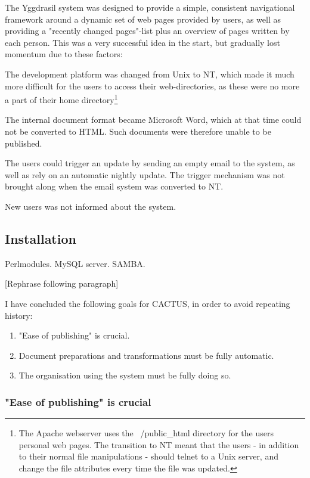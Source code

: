 The Yggdrasil system was designed to provide a simple, consistent
navigational framework around a dynamic set of web pages provided by
users, as well as providing a "recently changed pages"-list plus an
overview of pages written by each person.  This was a very successful
idea in the start, but gradually lost momentum due to these factors:

The development platform was changed from Unix to NT, which made it
much more difficult for the users to access their web-directories, as
these were no more a part of their home directory\footnote{The Apache
  webserver uses the ~/public\_html directory for the users personal
  web pages.  The transition to NT meant that the users - in addition
  to their normal file manipulations - should telnet to a Unix server,
  and change the file attributes every time the file was updated.  }

The internal document format became Microsoft Word, which at that time
could not be converted to HTML.  Such documents were therefore unable
to be published.

The users could trigger an update by sending an empty email to the
system, as well as rely on an automatic nightly update.  The trigger
mechanism was not brought along when the email system was converted to
NT.

New users was not informed about the system.

\subsection{Installation}
Perlmodules.  MySQL server. SAMBA.


[Rephrase following paragraph]

I have concluded the following goals for CACTUS, in order to avoid
repeating history:

\begin{enumerate}
\item "Ease of publishing" is crucial.
  
\item Document preparations and transformations must be fully
  automatic.
  
\item The organisation using the system must be fully doing so.

\end{enumerate}

\subsubsection{"Ease of publishing" is crucial}

